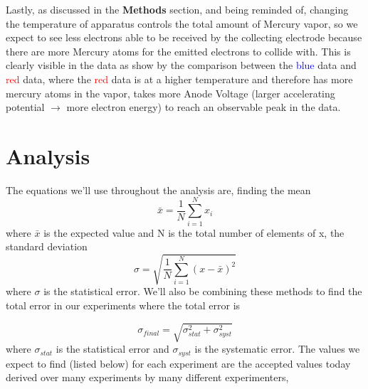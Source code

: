\documentclass[%
 reprint,
 amsmath,amssymb,
 aps,
]{revtex4-1}
\begin{document}
Lastly, as discussed in the \textbf{Methods} section, and being reminded of, changing the temperature of apparatus controls the total amount of Mercury vapor, so we expect to see less electrons able to be received by the collecting electrode because there are more Mercury atoms for the emitted electrons to collide with. This is clearly visible in the data as show by the comparison between the \textcolor{blue}{blue} data and \textcolor{red}{red} data, where the \textcolor{red}{red} data is at a higher temperature and therefore has more mercury atoms in the vapor, takes more Anode Voltage (larger accelerating potential $\rightarrow$ more electron energy) to reach an observable peak in the data. 

\section{\label{sec:data}Analysis}

The equations we'll use throughout the analysis are, finding the mean 
\begin{equation}\label{eq:mean}
\bar x = \frac{1}{N}\sum_{i=1}^N x_i
\end{equation} where $\bar x$ is the expected value and N is the total number of elements of x,
the standard deviation
\begin{equation}\label{eq:std}
\sigma = \sqrt{\frac{1}{N}\sum_{i = 1}^{N}(x - \bar x)^2}
\end{equation} where $\sigma$ is the statistical error. We'll also be combining these methods to find the total error in our experiments where the total error is 

\begin{equation}\label{eq:quad}
\sigma_{final} = \sqrt{\sigma_{stat}^2 +\sigma_{syst}^2} 
\end{equation} where $\sigma_{stat}$ is the statistical error and $\sigma_{syst}$ is the systematic error.
The values we expect to find (listed below) for each experiment are the accepted values today derived over many experiments by many different experimenters,
\end{document}
